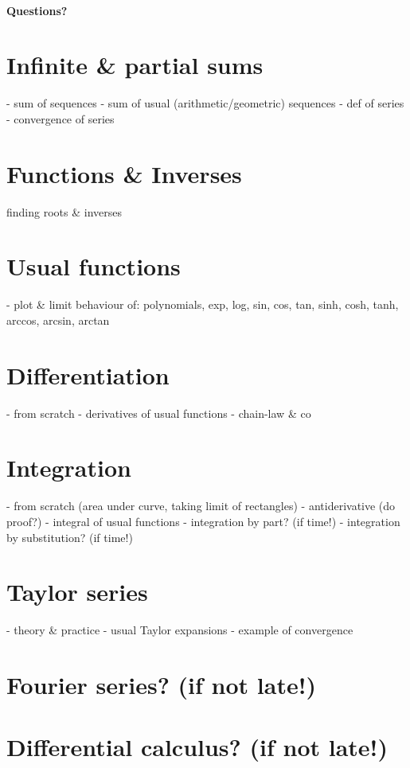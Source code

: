 \documentclass[11pt,a4paper]{article}
\begin{document}
\paragraph{Questions?}
\newpage




%

\section{Infinite \& partial sums}
- sum of sequences
- sum of usual (arithmetic/geometric) sequences
- def of series
- convergence of series

\section{Functions \& Inverses}
finding roots \& inverses
\section{Usual functions}
- plot \& limit behaviour of: polynomials, exp, log, sin, cos, tan, sinh, cosh, tanh, arccos, arcsin, arctan
\section{Differentiation}
- from scratch
- derivatives of usual functions
- chain-law \& co

\section{Integration}
- from scratch (area under curve, taking limit of rectangles)
- antiderivative (do proof?)
- integral of usual functions
- integration by part? (if time!)
- integration by substitution? (if time!)
\section{Taylor series}
- theory \& practice
- usual Taylor expansions
- example of convergence
\section{Fourier series? (if not late!)}
\section{Differential calculus? (if not late!)}
\end{document}
